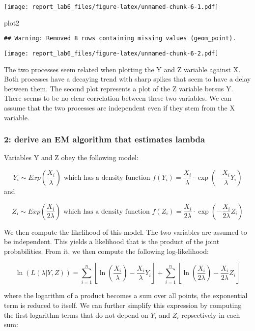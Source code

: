 \documentclass[
]{article}
\newenvironment{Shaded}{\begin{snugshade}}{\end{snugshade}}
\newcommand{\NormalTok}[1]{#1}
\begin{document}
\texttt{[image: report\_lab6\_files/figure-latex/unnamed-chunk-6-1.pdf]}

\begin{Shaded}
\begin{Highlighting}[]
\NormalTok{plot2}
\end{Highlighting}
\end{Shaded}

\begin{verbatim}
## Warning: Removed 8 rows containing missing values (geom_point).
\end{verbatim}

\texttt{[image: report\_lab6\_files/figure-latex/unnamed-chunk-6-2.pdf]}

The two processes seem related when plotting the Y and Z variable
against X. Both processes have a decaying trend with sharp spikes that
seem to have a delay between them. The second plot represents a plot of
the Z variable bersus Y. There seems to be no clear correlation between
these two variables. We can assume that the two processes are
independent even if they stem from the X variable.

\hypertarget{derive-an-em-algorithm-that-estimates-lambda}{%
\subsubsection{2: derive an EM algorithm that estimates
lambda}\label{derive-an-em-algorithm-that-estimates-lambda}}

Variables Y and Z obey the following model:

\[Y_i \sim Exp\left(\frac{X_i}{\lambda}\right) \text{ which has a density function } f(Y_i) = \frac{X_i}{\lambda} \cdot \exp\left( -\frac{X_i}{\lambda} Y_i \right)\]
and

\[Z_i \sim Exp\left(\frac{X_i}{2\lambda}\right) \text{ which has a density function } f(Z_i) = \frac{X_i}{2\lambda} \cdot \exp\left( -\frac{X_i}{2\lambda} Z_i \right)\]

We then compute the likelihood of this model. The two variables are
assumed to be independent. This yields a likelihood that is the product
of the joint probabilities. From it, we then compute the following
log-likelihood:

\[\ln(L(\lambda | Y,Z))= \sum_{i=1}^{n} \left[\ln\left( \frac{X_i}{\lambda} \right) -\frac{X_i}{\lambda} Y_i \right] + \sum_{i=1}^{n} \left[ \ln\left( \frac{X_i}{2\lambda} \right) - \frac{X_i}{2\lambda} Z_i \right]\]

where the logarithm of a product becomes a sum over all points, the
exponential term is reduced to itself. We can further simplify this
expression by computing the first logarithm terms that do not depend on
\(Y_i\) and \(Z_i\) repsectively in each sum:
\end{document}
